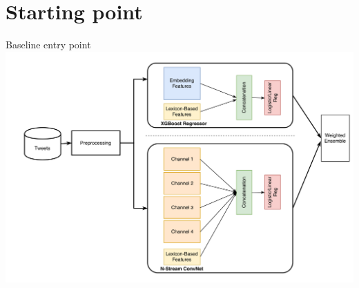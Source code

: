 \documentclass[10pt, utf8]{beamer}
\begin{document}
\section{Starting point}
\begin{frame}{Baseline entry point}
    \includegraphics[width=\textwidth]{architecture.png}
\end{frame}
\end{document}

